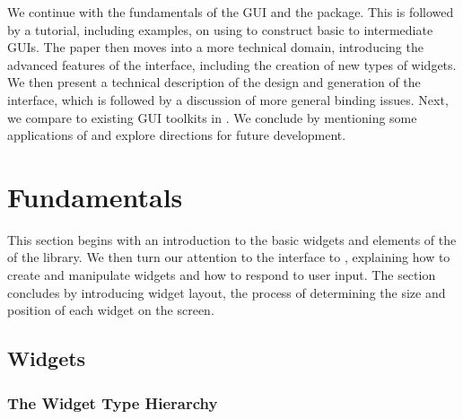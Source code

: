 \documentclass[article]{jss}
\begin{document}
We continue with the fundamentals of the  GUI and the
 package. This is followed by a tutorial, including
examples, on using  to construct basic to intermediate
GUIs. The paper then moves into a more technical domain, introducing
the advanced features of the interface, including the creation of new
types of widgets. We then present a technical description of the
design and generation of the interface, which is followed by a
discussion of more general binding issues.  Next, we compare
 to existing GUI toolkits in .  We conclude by
mentioning some applications of  and explore directions for
future development.

\section{Fundamentals}

This section begins with an introduction to the basic widgets and
elements of the of the  library.  We then turn our attention
to the  interface to , explaining how to
create and manipulate widgets and how to respond to user input. The
section concludes by introducing widget layout, the process of
determining the size and position of each widget on the screen.


\subsection[GTK+ Widgets]{ Widgets}

\subsubsection{The Widget Type Hierarchy}
\end{document}
